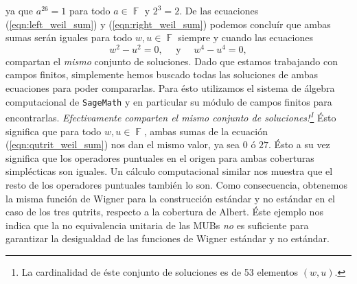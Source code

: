 \documentclass[a4paper, 11pt]{article}
\DeclareMathOperator{\F}{\mathbb{F}}
\begin{document}
  ya que $a^{26} = 1$ para todo $a \in \F$ y $2^{3} = 2$.
  De las ecuaciones (\ref{eqn:left_weil_sum}) y
  (\ref{eqn:right_weil_sum}) podemos concluír que ambas
  sumas serán iguales para todo $w, u \in \F$ siempre y
  cuando las ecuaciones
  \begin{equation}
    w^2 - u^2 = 0,
    \quad
    \text{ y }
    \quad
    w^{4} - u^{4} = 0,
  \end{equation}
  compartan el \textit{mismo} conjunto de soluciones. Dado
  que estamos trabajando con campos finitos, simplemente
  hemos buscado todas las soluciones de ambas ecuaciones
  para poder compararlas. Para ésto utilizamos el sistema de
  álgebra computacional de \texttt{SageMath} y en particular
  su módulo de campos finitos para encontrarlas.
  \textit{Efectivamente comparten el mismo conjunto de
  soluciones!\footnote{La cardinalidad de éste conjunto de
  soluciones es de 53 elementos $(w,u)$.}} Ésto significa
  que para todo $w, u \in \F$, ambas sumas de la ecuación
  (\ref{eqn:qutrit_weil_sum}) nos dan el mismo valor, ya sea
  $0$ ó $27$. Ésto a su vez significa que los operadores
  puntuales en el origen para ambas coberturas simplécticas
  son iguales. Un cálculo computacional similar nos muestra
  que el resto de los operadores puntuales también lo son.
  Como consecuencia, obtenemos la misma función de Wigner
  para la construcción estándar y no estándar en el caso de
  los tres qutrits, respecto a la cobertura de Albert. Éste
  ejemplo nos indica que la no equivalencia unitaria de las
  MUBs \textit{no} es suficiente para garantizar la
  desigualdad de las funciones de Wigner estándar y no
  estándar.
  
\end{document}

